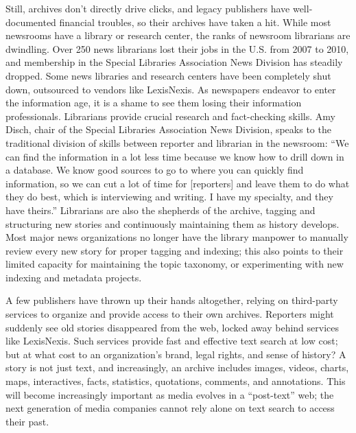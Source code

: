 Still, archives don't directly drive clicks, and legacy publishers have well-documented financial troubles, so their archives have taken a hit. While most newsrooms have a library or research center, the ranks of newsroom librarians are dwindling. Over 250 news librarians lost their jobs in the U.S. from 2007 to 2010, and membership in the Special Libraries Association News Division has steadily dropped. Some news libraries and research centers have been completely shut down, outsourced to vendors like LexisNexis.\autocite{silverman_endangered_2010} As newspapers endeavor to enter the information age, it is a shame to see them losing their information professionals. Librarians provide crucial research and fact-checking skills. Amy Disch, chair of the Special Libraries Association News Division, speaks to the traditional division of skills between reporter and librarian in the newsroom: ``We can find the information in a lot less time because we know how to drill down in a database. We know good sources to go to where you can quickly find information, so we can cut a lot of time for [reporters] and leave them to do what they do best, which is interviewing and writing. I have my specialty, and they have theirs.''\autocite{silverman_endangered_2010} Librarians are also the shepherds of the archive, tagging and structuring new stories and continuously maintaining them as history develops. Most major news organizations no longer have the library manpower to manually review every new story for proper tagging and indexing; this also points to their limited capacity for maintaining the topic taxonomy, or experimenting with new indexing and metadata projects.


A few publishers have thrown up their hands altogether, relying on third-party services to organize and provide access to their own archives.\autocite{romenesko_u.s._2014} Reporters might suddenly see old stories disappeared from the web, locked away behind services like LexisNexis. Such services provide fast and effective text search at low cost; but at what cost to an organization's brand, legal rights, and sense of history? A story is not just text, and increasingly, an archive includes images, videos, charts, maps, interactives, facts, statistics, quotations, comments, and annotations. This will become increasingly important as media evolves in a ``post-text'' web; the next generation of media companies cannot rely alone on text search to access their past.\autocite{salmon_why_2014}

